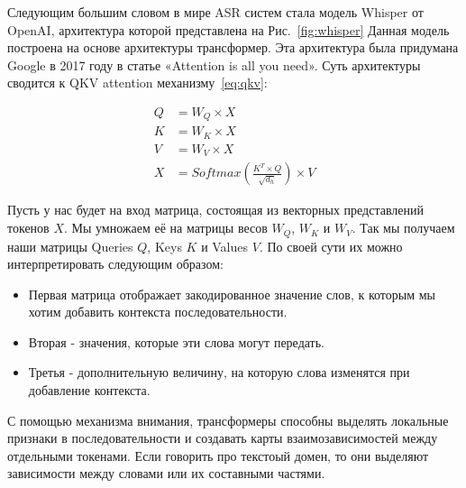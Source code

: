 Следующим большим словом в мире ASR систем стала модель Whisper от OpenAI\cite{radford2023robust}, архитектура которой представлена на Рис.~\ref{fig:whisper}
Данная модель построена на основе архитектуры трансформер\cite{devlin2019bert,radford2018improving,radford2019language}.
Эта архитектура была придумана Google в 2017 году в статье «Attention is all you need»\cite{vaswani2017attention}.
Суть архитектуры сводится к QKV attention механизму~\ref{eq:qkv}:

\begin{equation}
  \begin{aligned}
    Q &= W_Q \times X \\
    K &= W_K \times X \\
    V &= W_V \times X \\
    X &= Softmax(\frac{K^T \times Q}{\sqrt{d_h}}) \times V
  \end{aligned}
  \label{eq:qkv}
\end{equation}

Пусть у нас будет на вход матрица, состоящая из векторных представлений токенов $X$.
Мы умножаем её на матрицы весов $W_Q$, $W_K$ и $W_V$.
Так мы получаем наши матрицы Queries $Q$, Keys $K$ и Values $V$.
По своей сути их можно интерпретировать следующим образом:
\begin{itemize}
  \item Первая матрица отображает закодированное значение слов, к которым мы хотим добавить контекста последовательности.
  \item Вторая - значения, которые эти слова могут передать.
  \item Третья - дополнительную величину, на которую слова изменятся при добавление контекста.
\end{itemize} 

С помощью механизма внимания, трансформеры способны выделять локальные признаки в последовательности и создавать карты взаимозависимостей между отдельными токенами.
Если говорить про текстоый домен, то они выделяют зависимости между словами или их составными частями.

